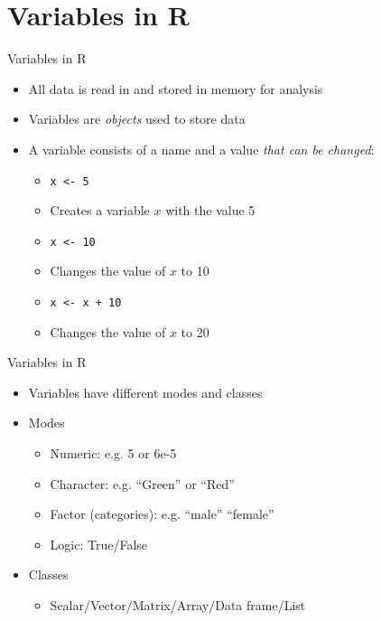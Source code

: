 \documentclass[aspectratio=169]{beamer}\usepackage[]{graphicx}\usepackage[]{color}
\begin{document}
\section{Variables in R}
\begin{frame}{Variables in R}
\begin{itemize}
  \item All data is read in and stored in memory for analysis
  \item Variables are \emph{objects} used to store data
  \item A variable consists of a name and a value \emph{that can be changed}:
		\begin{itemize}
			\item  \texttt{x <- 5}
			\item Creates a variable $x$ with the value 5
			\item  \texttt{x <- 10}
			\item Changes the value of $x$ to 10
			\item  \texttt{x <- x + 10}
			\item Changes the value of $x$ to 20
		\end{itemize}
	\end{itemize}
\end{frame}

\begin{frame}{Variables in R}
\begin{itemize}
	\item Variables have different modes and classes
	\item Modes
		\begin{itemize}
			\item Numeric:		e.g. 5 or 6e-5	
			\item Character:	e.g. ``Green'' or ``Red''
			\item Factor (categories):		e.g. ``male'' ``female''
			\item Logic:		True/False
		\end{itemize}
	\item Classes
		\begin{itemize}
			\item Scalar/Vector/Matrix/Array/Data frame/List
		\end{itemize}
	\end{itemize}
\end{frame}
\end{document}

